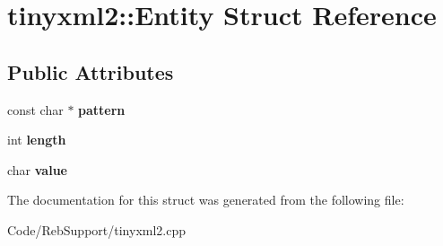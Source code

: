 \hypertarget{structtinyxml2_1_1_entity}{}\section{tinyxml2\+:\+:Entity Struct Reference}
\label{structtinyxml2_1_1_entity}
\subsection*{Public Attributes}
\begin{DoxyCompactItemize}
\item 
const char $\ast$ {\bfseries pattern}\hypertarget{structtinyxml2_1_1_entity_ab330f5d665d29bfc811ecfa76315894b}{}\label{structtinyxml2_1_1_entity_ab330f5d665d29bfc811ecfa76315894b}

\item 
int {\bfseries length}\hypertarget{structtinyxml2_1_1_entity_a25e2b57cb59cb4fa68f283d7cb570f21}{}\label{structtinyxml2_1_1_entity_a25e2b57cb59cb4fa68f283d7cb570f21}

\item 
char {\bfseries value}\hypertarget{structtinyxml2_1_1_entity_a7334e81e33b4615655a403711b24f3ed}{}\label{structtinyxml2_1_1_entity_a7334e81e33b4615655a403711b24f3ed}

\end{DoxyCompactItemize}


The documentation for this struct was generated from the following file\+:\begin{DoxyCompactItemize}
\item 
Code/\+Reb\+Support/tinyxml2.\+cpp\end{DoxyCompactItemize}
